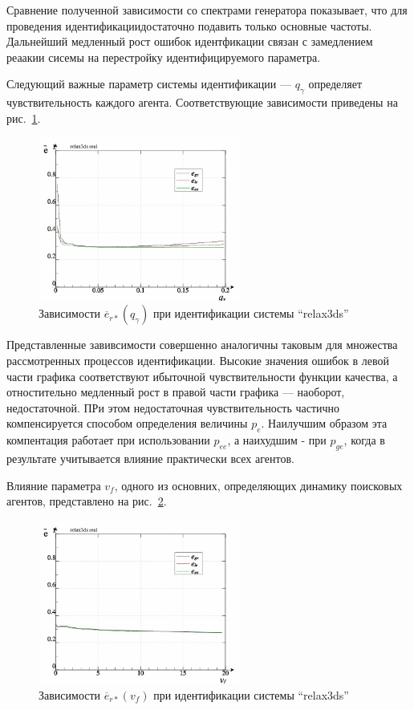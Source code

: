 Сравнение полученной зависимости со спектрами генератора показывает,
что для проведения идентификациидостаточно подавить только
основные частоты. Дальнейший медленный рост ошибок
идентфикации связан с замедлением реаакии сисемы на перестройку идентифицируемого параметра.

Следующий важные параметр системы идентификации --- $q_\gamma$
определяет чувствительность каждого агента. Соответствующие зависимости приведены на
рис.~\ref{atu:f:relax3ds_read_id2_prm_0-p_q_gamma}.


\begin{figure}[htb!]
  \centerline{\includegraphics[width=0.6\textwidth]{p/relax3ds_read_id2_prm_0-p_q_gamma.png} }
  \caption{Зависимости $\overline{e}_{r*}(q_\gamma)$ при идентификации системы ``relax3ds''}
  \label{atu:f:relax3ds_read_id2_prm_0-p_q_gamma}
\end{figure}

Представленные завивсимости совершенно аналогичны таковым
для множества рассмотренных процессов идентификации.
Высокие значения ошибок в левой части графика соответствуют
ибыточной чувствительности функции качества, а отностительно медленный
рост в правой части графика --- наоборот, недостаточной.
ПРи этом недостаточная чувствительность частично компенсируется способом
определения величины $p_e$. %
Наилучшим образом эта компентация работает при использовании $p_{ee}$,
а наихудшим - при $p_{ge}$, когда в результате учитывается влияние практически всех
агентов.

Влияние параметра $v_f$, одного из основних, определяющих динамику поисковых агентов,
представлено на рис.~\ref{atu:f:relax3ds_read_id2_prm_0-p_v_f}.

\begin{figure}[htb!]
  \centerline{\includegraphics[width=0.6\textwidth]{p/relax3ds_read_id2_prm_0-p_v_f.png} }
  \caption{Зависимости $\overline{e}_{r*}(v_f)$ при идентификации системы ``relax3ds''}
  \label{atu:f:relax3ds_read_id2_prm_0-p_v_f}
\end{figure}

